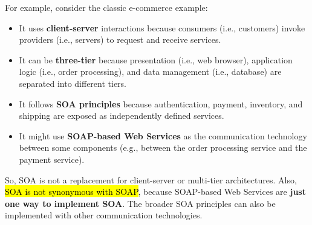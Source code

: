 \highspace
For example, consider the classic e-commerce example:
\begin{itemize}
    \item It uses \textbf{client-server} interactions because consumers (i.e., customers) invoke providers (i.e., servers) to request and receive services.
    \item It can be \textbf{three-tier} because presentation (i.e., web browser), application logic (i.e., order processing), and data management (i.e., database) are separated into different tiers.
    \item It follows \textbf{SOA principles} because authentication, payment, inventory, and shipping are exposed as independently defined services.
    \item It might use \textbf{SOAP-based Web Services} as the communication technology between some components (e.g., between the order processing service and the payment service).
\end{itemize}
So, SOA is not a replacement for client-server or multi-tier architectures. Also, \hl{SOA is not synonymous with SOAP}, because SOAP-based Web Services are \textbf{just one way to implement SOA}. The broader SOA principles can also be implemented with other communication technologies.

